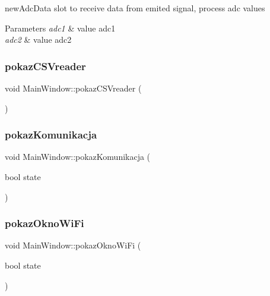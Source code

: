 new\+Adc\+Data slot to receive data from emited signal, process adc values 


\begin{DoxyParams}{Parameters}
{\em adc1} & value adc1 \\
\hline
{\em adc2} & value adc2 \\
\hline
\end{DoxyParams}
\mbox{\label{class_main_window_a67bd4592c9f76e24a3e2398a6d362c5d}} 
\subsubsection{\texorpdfstring{pokaz\+C\+S\+Vreader}{pokazCSVreader}}
{\footnotesize\ttfamily void Main\+Window\+::pokaz\+C\+S\+Vreader (\begin{DoxyParamCaption}{ }\end{DoxyParamCaption})\hspace{0.3cm}{\ttfamily [slot]}}

\mbox{\label{class_main_window_a0f0b8e878849a65e6c5b2405fe22f26e}} 
\subsubsection{\texorpdfstring{pokaz\+Komunikacja}{pokazKomunikacja}}
{\footnotesize\ttfamily void Main\+Window\+::pokaz\+Komunikacja (\begin{DoxyParamCaption}\item[{bool}]{state }\end{DoxyParamCaption})\hspace{0.3cm}{\ttfamily [slot]}}

\mbox{\label{class_main_window_a84238e487942aac887ca4702844ed26e}} 
\subsubsection{\texorpdfstring{pokaz\+Okno\+Wi\+Fi}{pokazOknoWiFi}}
{\footnotesize\ttfamily void Main\+Window\+::pokaz\+Okno\+Wi\+Fi (\begin{DoxyParamCaption}\item[{bool}]{state }\end{DoxyParamCaption})\hspace{0.3cm}{\ttfamily [slot]}}

